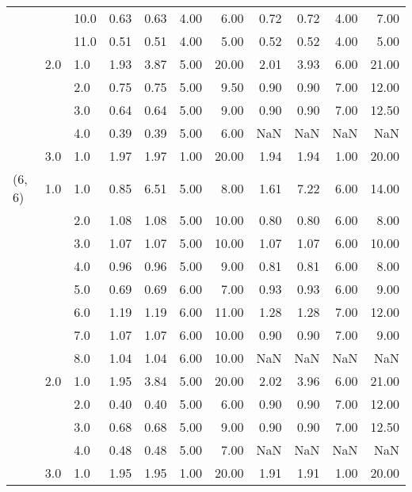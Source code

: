 \begin{tabular}{lllrrrrrrrr}
       &     & 10.0 &       0.63 &      0.63 & 4.00 &   6.00 &       0.72 &      0.72 & 4.00 &   7.00 \\
       &     & 11.0 &       0.51 &      0.51 & 4.00 &   5.00 &       0.52 &      0.52 & 4.00 &   5.00 \\
       & 2.0 & 1.0  &       1.93 &      3.87 & 5.00 &  20.00 &       2.01 &      3.93 & 6.00 &  21.00 \\
       &     & 2.0  &       0.75 &      0.75 & 5.00 &   9.50 &       0.90 &      0.90 & 7.00 &  12.00 \\
       &     & 3.0  &       0.64 &      0.64 & 5.00 &   9.00 &       0.90 &      0.90 & 7.00 &  12.50 \\
       &     & 4.0  &       0.39 &      0.39 & 5.00 &   6.00 &        NaN &       NaN &  NaN &    NaN \\
       & 3.0 & 1.0  &       1.97 &      1.97 & 1.00 &  20.00 &       1.94 &      1.94 & 1.00 &  20.00 \\
(6, 6) & 1.0 & 1.0  &       0.85 &      6.51 & 5.00 &   8.00 &       1.61 &      7.22 & 6.00 &  14.00 \\
       &     & 2.0  &       1.08 &      1.08 & 5.00 &  10.00 &       0.80 &      0.80 & 6.00 &   8.00 \\
       &     & 3.0  &       1.07 &      1.07 & 5.00 &  10.00 &       1.07 &      1.07 & 6.00 &  10.00 \\
       &     & 4.0  &       0.96 &      0.96 & 5.00 &   9.00 &       0.81 &      0.81 & 6.00 &   8.00 \\
       &     & 5.0  &       0.69 &      0.69 & 6.00 &   7.00 &       0.93 &      0.93 & 6.00 &   9.00 \\
       &     & 6.0  &       1.19 &      1.19 & 6.00 &  11.00 &       1.28 &      1.28 & 7.00 &  12.00 \\
       &     & 7.0  &       1.07 &      1.07 & 6.00 &  10.00 &       0.90 &      0.90 & 7.00 &   9.00 \\
       &     & 8.0  &       1.04 &      1.04 & 6.00 &  10.00 &        NaN &       NaN &  NaN &    NaN \\
       & 2.0 & 1.0  &       1.95 &      3.84 & 5.00 &  20.00 &       2.02 &      3.96 & 6.00 &  21.00 \\
       &     & 2.0  &       0.40 &      0.40 & 5.00 &   6.00 &       0.90 &      0.90 & 7.00 &  12.00 \\
       &     & 3.0  &       0.68 &      0.68 & 5.00 &   9.00 &       0.90 &      0.90 & 7.00 &  12.50 \\
       &     & 4.0  &       0.48 &      0.48 & 5.00 &   7.00 &        NaN &       NaN &  NaN &    NaN \\
       & 3.0 & 1.0  &       1.95 &      1.95 & 1.00 &  20.00 &       1.91 &      1.91 & 1.00 &  20.00 \\
\bottomrule
\end{tabular}

